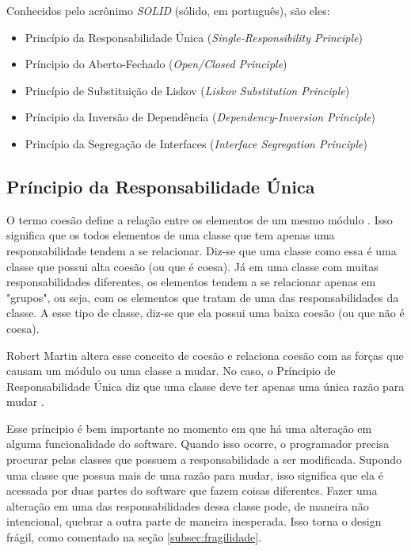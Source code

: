 Conhecidos pelo acrônimo \textit{SOLID} (sólido, em português), são eles:

\begin{itemize}
	\item Princípio da Responsabilidade Única (\textit{Single-Responsibility Principle})
	\item Príncipio do Aberto-Fechado (\textit{Open/Closed Principle})
	\item Princípio de Substituição de Liskov (\textit{Liskov Substitution Principle})
	\item Príncipio da Inversão de Dependência (\textit{Dependency-Inversion Principle})
	\item Princípio da Segregação de Interfaces (\textit{Interface Segregation Principle})
\end{itemize}

\subsection{Príncipio da Responsabilidade Única}
\label{subsec:principio-srp}

O termo coesão define a relação entre os elementos de um mesmo módulo \cite{demarco} \cite{pagejones}. Isso significa que
os todos elementos de uma classe que tem apenas uma responsabilidade tendem a se relacionar. Diz-se que uma classe
como essa é uma classe que possui alta coesão (ou que é coesa). Já em uma classe
com muitas responsabilidades diferentes, os elementos tendem a se relacionar apenas em "grupos", ou seja, com os elementos
que tratam de uma das responsabilidades da classe. A esse tipo de classe, diz-se que ela possui uma baixa coesão (ou que não é
coesa).

Robert Martin altera esse conceito de coesão e relaciona coesão com as forças que causam um módulo ou uma classe a mudar. No caso,
o Príncipio de Responsabilidade Única diz que uma classe deve ter apenas uma única razão para mudar \cite{bob-martin}.

Esse príncipio é bem importante no momento em que há uma alteração em alguma funcionalidade do software. Quando isso ocorre,
o programador precisa procurar pelas classes que possuem a responsabilidade a ser modificada. Supondo uma classe que 
possua mais de uma razão para mudar, isso significa que ela é acessada por duas partes do software que fazem coisas diferentes.
Fazer uma alteração em uma das responsabilidades dessa classe pode, de maneira não intencional, quebrar a outra parte
de maneira inesperada. Isso torna o design frágil, como comentado na seção \ref{subsec:fragilidade}.

